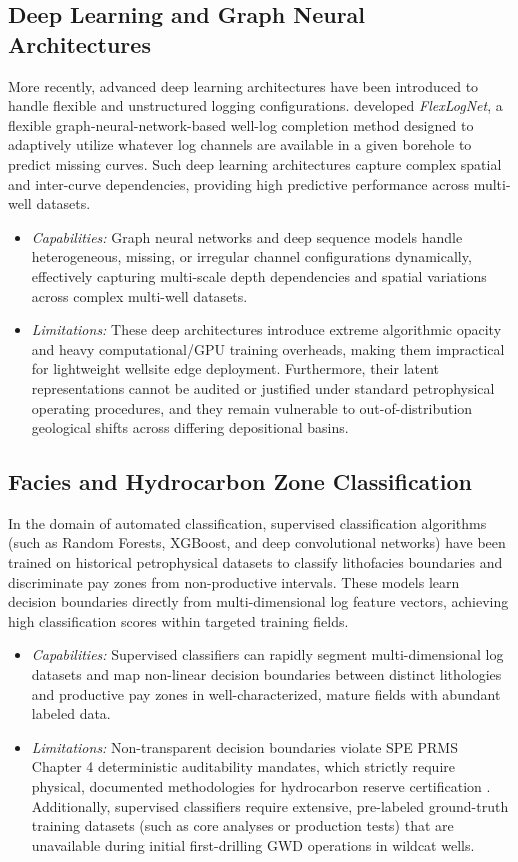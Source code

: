 \subsection{Deep Learning and Graph Neural Architectures}
More recently, advanced deep learning architectures have been introduced to handle flexible and unstructured logging configurations. \citet{ref6} developed \textit{FlexLogNet}, a flexible graph-neural-network-based well-log completion method designed to adaptively utilize whatever log channels are available in a given borehole to predict missing curves. Such deep learning architectures capture complex spatial and inter-curve dependencies, providing high predictive performance across multi-well datasets.
\begin{itemize}
    \item \textit{Capabilities:} Graph neural networks and deep sequence models handle heterogeneous, missing, or irregular channel configurations dynamically, effectively capturing multi-scale depth dependencies and spatial variations across complex multi-well datasets.
    \item \textit{Limitations:} These deep architectures introduce extreme algorithmic opacity and heavy computational/GPU training overheads, making them impractical for lightweight wellsite edge deployment. Furthermore, their latent representations cannot be audited or justified under standard petrophysical operating procedures, and they remain vulnerable to out-of-distribution geological shifts across differing depositional basins.
\end{itemize}

\subsection{Facies and Hydrocarbon Zone Classification}
In the domain of automated classification, supervised classification algorithms (such as Random Forests, XGBoost, and deep convolutional networks) have been trained on historical petrophysical datasets to classify lithofacies boundaries and discriminate pay zones from non-productive intervals. These models learn decision boundaries directly from multi-dimensional log feature vectors, achieving high classification scores within targeted training fields.
\begin{itemize}
    \item \textit{Capabilities:} Supervised classifiers can rapidly segment multi-dimensional log datasets and map non-linear decision boundaries between distinct lithologies and productive pay zones in well-characterized, mature fields with abundant labeled data.
    \item \textit{Limitations:} Non-transparent decision boundaries violate SPE PRMS Chapter 4 deterministic auditability mandates, which strictly require physical, documented methodologies for hydrocarbon reserve certification \citep{ref2, ref3}. Additionally, supervised classifiers require extensive, pre-labeled ground-truth training datasets (such as core analyses or production tests) that are unavailable during initial first-drilling GWD operations in wildcat wells.
\end{itemize}